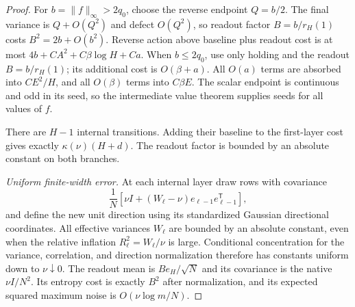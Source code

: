 \begin{proof}
For $b=\|f\|_\infty>2q_0$, choose the reverse endpoint $Q=b/2$. The final variance is $Q+O(Q^2)$ and defect $O(Q^2)$, so readout factor $B=b/r_H(1)$ costs $B^2=2b+O(b^2)$. Reverse action above baseline plus readout cost is at most $4b+CA^2+C\beta\log H+Ca$. When $b\le2q_0$, use only holding and the readout $B=b/r_H(1)$; its additional cost is $O(\beta+a)$. All $O(a)$ terms are absorbed into $CE^2/H$, and all $O(\beta)$ terms into $C\beta E$. The scalar endpoint is continuous and odd in its seed, so the intermediate value theorem supplies seeds for all values of $f$.

There are $H-1$ internal transitions. Adding their baseline to the first-layer cost gives exactly $\kappa(\nu)(H+d)$. The readout factor is bounded by an absolute constant on both branches.

\emph{Uniform finite-width error.}
At each internal layer draw rows with covariance
\[
 \frac1N[\nu I+(W_\ell-\nu)e_{\ell-1}e_{\ell-1}^{\mathsf T}],
\]
and define the new unit direction using its standardized Gaussian directional coordinates. All effective variances $W_\ell$ are bounded by an absolute constant, even when the relative inflation $R_\ell^2=W_\ell/\nu$ is large. Conditional concentration for the variance, correlation, and direction normalization therefore has constants uniform down to $\nu\downarrow0$. The readout mean is $Be_H/\sqrt N$ and its covariance is the native $\nu I/N^2$. Its entropy cost is exactly $B^2$ after normalization, and its expected squared maximum noise is $O(\nu\log m/N)$.


\end{proof}
